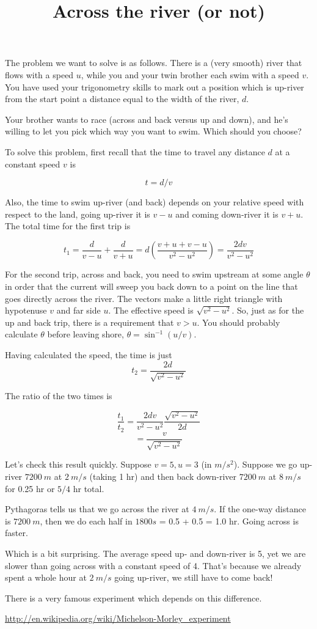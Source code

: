 \documentclass[11pt, oneside]{article}
\title{Across the river (or not)}
\date{}
\begin{document}
\maketitle
\Large

The problem we want to solve is as follows.  There is a (very smooth) river that flows with a speed $u$, while you and your twin brother each swim with a speed $v$.  You have used your trigonometry skills to mark out a position which is up-river from the start point a distance equal to the width of the river, $d$.

Your brother wants to race (across and back versus up and down), and he's willing to let you pick which way you want to swim.  Which should you choose?

To solve this problem, first recall that the time to travel any distance $d$ at a constant speed $v$ is 

\[ t = d/v \]

Also, the time to swim up-river (and back) depends on your relative speed with respect to the land, going up-river it is $v-u$ and coming down-river it is $v+u$.  The total time for the first trip is

\[ t_1 = \frac{d}{v-u} + \frac{d}{v+u} = d(\frac{v + u + v - u}{v^2-u^2}) = \frac{2dv}{v^2-u^2}\]

For the second trip, across and back, you need to swim upstream at some angle $\theta$ in order that the current will sweep you back down to a point on the line that goes directly across the river.  The vectors make a little right triangle with hypotenuse $v$ and far side $u$.  The effective speed is $\sqrt{v^2 - u^2}$.  So, just as for the up and back trip, there is a requirement that $v > u$.  You should probably calculate $\theta$ before leaving shore, $\theta = \sin^{-1}(u/v)$.

Having calculated the speed, the time is just
\[ t_2 = \frac{2d}{\sqrt{v^2 - u^2}} \]

The ratio of the two times is

\[ \frac{t_1}{t_2} = \frac{2dv}{v^2-u^2} \frac{\sqrt{v^2 - u^2}}{2d} \]
\[ = \frac{v}{\sqrt{v^2 - u^2}} \]

Let's check this result quickly.  Suppose $v=5, u=3$ (in $m/s^2$).  Suppose we go up-river $7200 \ m$ at $2 \ m/s$ (taking 1 hr) and then back down-river $7200 \ m$ at $8 \ m/s$ for 0.25 hr or $5/4$ hr total.  

Pythagoras tells us that we go across the river at $4\  m/s$.  If the one-way distance is $7200 \ m$, then we do each half in $1800 s$ = 0.5 + 0.5 = 1.0 hr.  Going across is faster.

Which is a bit surprising.  The average speed up- and down-river is 5, yet we are slower than going across with a constant speed of 4.  That's because we already spent a whole hour at $2 \ m/s$ going up-river, we still have to come back!

There is a very famous experiment which depends on this difference.

\url{http://en.wikipedia.org/wiki/Michelson-Morley_experiment}
\end{document}
